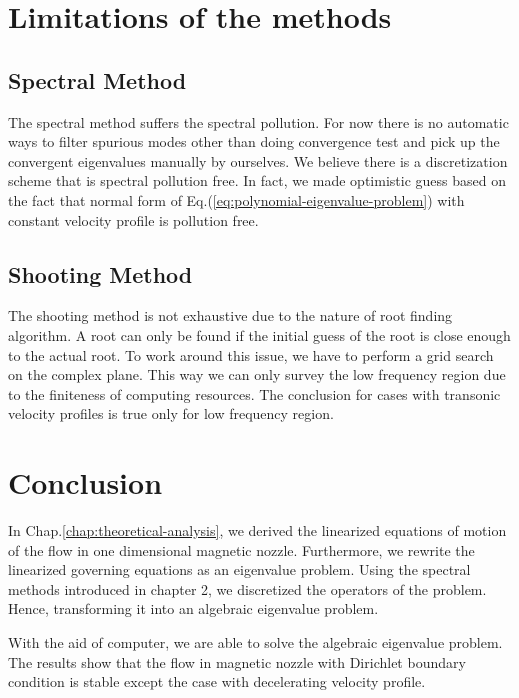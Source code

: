 \section{Limitations of the methods}
\subsection{Spectral Method}
The spectral method suffers the spectral pollution. For now there is no automatic ways to filter spurious modes other than doing convergence test and pick up the convergent eigenvalues manually by ourselves. We believe there is a discretization scheme that is spectral pollution free. In fact, we made optimistic guess based on the fact that normal form of Eq.(\ref{eq:polynomial-eigenvalue-problem}) with constant velocity profile is pollution free.

\subsection{Shooting Method}
The shooting method is not exhaustive due to the nature of root finding algorithm. A root can only be found if the initial guess of the root is close enough to the actual root. To work around this issue, we have to perform a grid search on the complex plane. This way we can only survey the low frequency region due to the finiteness of computing resources. The conclusion for cases with transonic velocity profiles is true only for low frequency region.

\section{Conclusion}
In Chap.\ref{chap:theoretical-analysis}, we derived the linearized equations of motion of the flow in one dimensional magnetic nozzle. Furthermore, we rewrite the linearized governing equations as an eigenvalue problem. Using the spectral methods introduced in chapter 2, we discretized the operators of the problem. Hence, transforming it into an algebraic eigenvalue problem.

With the aid of computer, we are able to solve the algebraic eigenvalue problem. The results show that the flow in magnetic nozzle with Dirichlet boundary condition is stable except the case with decelerating velocity profile.